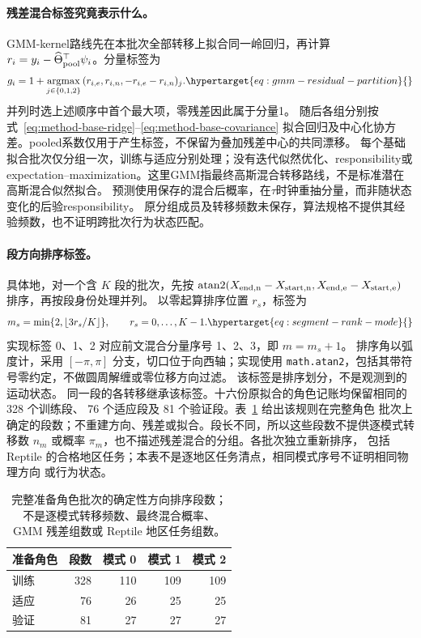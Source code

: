 \paragraph{残差混合标签究竟表示什么。}
\label{sec:residual-mixture-fit}\hypertarget{sec:residual-mixture-fit}{}
GMM-kernel路线先在本批次全部转移上拟合同一岭回归，再计算
\(r_i=y_i-\widehat\Theta_{\rm pool}^\top\psi_i\)。分量标签为
\begin{align}
 g_i=1+\underset{j\in\{0,1,2\}}{\operatorname{argmax}}\,
       (r_{i,e},r_{i,n},-r_{i,e}-r_{i,n})_j .
 \label{eq:gmm-residual-partition}\hypertarget{eq:gmm-residual-partition}{}
\end{align}
并列时选上述顺序中首个最大项，零残差因此属于分量1。
随后各组分别按式~\eqref{eq:method-base-ridge}--\eqref{eq:method-base-covariance}
拟合回归及中心化协方差。pooled系数仅用于产生标签，不保留为叠加残差中心的共同漂移。
每个基础拟合批次仅分组一次，训练与适应分别处理；没有迭代似然优化、responsibility或
expectation--maximization。这里GMM指最终高斯混合转移路线，不是标准潜在高斯混合似然拟合。
预测使用保存的混合后概率，在\(\tau\)时钟重抽分量，而非随状态变化的后验responsibility。
原分组成员及转移频数未保存，算法规格不提供其经验频数，也不证明跨批次行为状态匹配。

\paragraph{段方向排序标签。}
具体地，对一个含 \(K\) 段的批次，先按
\(\operatorname{atan2}(X_{\rm end,n}-X_{\rm start,n},
X_{\rm end,e}-X_{\rm start,e})\) 排序，再按段身份处理并列。
以零起算排序位置 \(r_s\)，标签为
\begin{equation}
m_s=\min\{2,\lfloor 3r_s/K\rfloor\},\qquad r_s=0,\ldots,K-1.
\label{eq:segment-rank-mode}\hypertarget{eq:segment-rank-mode}{}
\end{equation}
实现标签 0、1、2 对应前文混合分量序号 1、2、3，即 \(m=m_s+1\)。
排序角以弧度计，采用 \([-\pi,\pi]\) 分支，切口位于向西轴；实现使用
\texttt{math.atan2}，包括其带符号零约定，不做圆周解缠或零位移方向过滤。
该标签是排序划分，不是观测到的运动状态。
同一段的各转移继承该标签。十六份原拟合的角色记账均保留相同的 328 个训练段、
76 个适应段及 81 个验证段。表~\ref{tab:mode-rank-cardinality} 给出该规则在完整角色
批次上确定的段数；不重建方向、残差或拟合。段长不同，所以这些段数不提供逐模式转移数
\(n_m\) 或概率 \(\pi_m\)，也不描述残差混合的分组。各批次独立重新排序，
包括 Reptile 的合格地区任务；本表不是逐地区任务清点，相同模式序号不证明相同物理方向
或行为状态。

\begin{table}[htbp]
\centering\small
\caption{完整准备角色批次的确定性方向排序段数；不是逐模式转移频数、最终混合概率、
GMM 残差组数或 Reptile 地区任务组数。}
\label{tab:mode-rank-cardinality}\hypertarget{tab:mode-rank-cardinality}{}
\begin{tabular}{lrrrr}
\toprule
准备角色 & 段数 & 模式 0 & 模式 1 & 模式 2\\
\midrule
训练 & 328 & 110 & 109 & 109\\
适应 & 76 & 26 & 25 & 25\\
验证 & 81 & 27 & 27 & 27\\
\bottomrule
\end{tabular}
\end{table}

